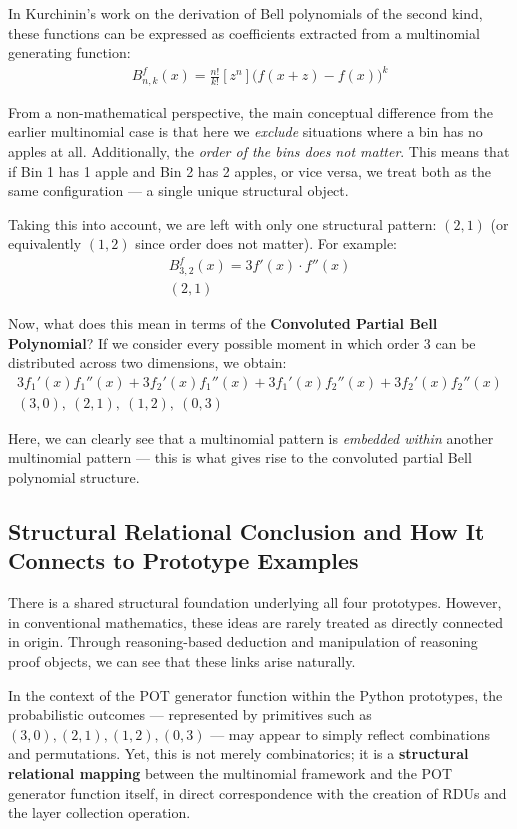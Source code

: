 \documentclass[11pt]{article}
\begin{document}
In Kurchinin’s work on the derivation of Bell polynomials of the second kind, these functions can be expressed as coefficients extracted from a multinomial generating function:
\begin{align*}
    B_{n,k}^f(x) = \frac{n!}{k!} [z^n]\big(f(x+z) - f(x)\big)^k
\end{align*}

From a non-mathematical perspective, the main conceptual difference from the earlier multinomial case is that here we \emph{exclude} situations where a bin has no apples at all.  
Additionally, the \emph{order of the bins does not matter}.  
This means that if Bin 1 has 1 apple and Bin 2 has 2 apples, or vice versa, we treat both as the same configuration — a single unique structural object.

Taking this into account, we are left with only one structural pattern: $(2,1)$ (or equivalently $(1,2)$ since order does not matter).  
For example:
\begin{align*}
    B_{3,2}^f(x) = 3 f'(x) \cdot f''(x) \\
    (2,1)
\end{align*}

Now, what does this mean in terms of the \textbf{Convoluted Partial Bell Polynomial}?  
If we consider every possible moment in which order 3 can be distributed across two dimensions, we obtain:
\begin{align*}
3f_1'(x)f_1''(x) + 3f_2'(x)f_1''(x) + 3f_1'(x)f_2''(x) + 3f_2'(x)f_2''(x)
\\
(3,0),\ (2,1),\ (1,2),\ (0,3)
\end{align*}

Here, we can clearly see that a multinomial pattern is \emph{embedded within} another multinomial pattern — this is what gives rise to the convoluted partial Bell polynomial structure.

\subsection{Structural Relational Conclusion and How It Connects to Prototype Examples}

There is a shared structural foundation underlying all four prototypes.  
However, in conventional mathematics, these ideas are rarely treated as directly connected in origin.  
Through reasoning-based deduction and manipulation of reasoning proof objects, we can see that these links arise naturally.

In the context of the POT generator function within the Python prototypes, the probabilistic outcomes — represented by primitives such as $(3,0), (2,1), (1,2), (0,3)$ — may appear to simply reflect combinations and permutations.  
Yet, this is not merely combinatorics; it is a \textbf{structural relational mapping} between the multinomial framework and the POT generator function itself, in direct correspondence with the creation of RDUs and the layer collection operation.
\end{document}
